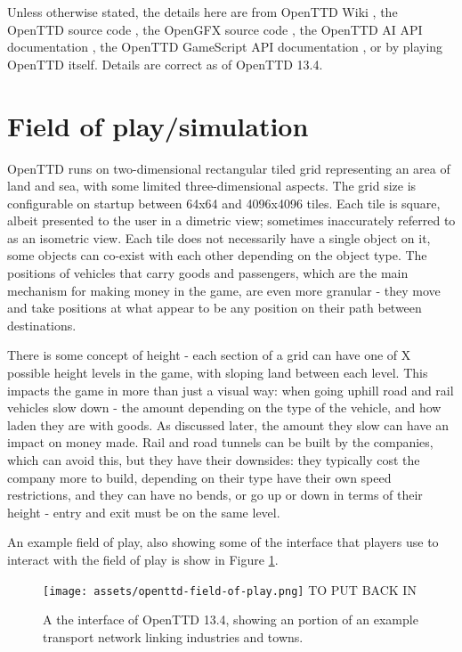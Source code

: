 \documentclass[logo,msc,dsti]{infthesis}    %
\begin{document}
Unless otherwise stated, the details here are from OpenTTD Wiki \cite{OpenTTDWiki}, the OpenTTD source code \cite{OpenTTDSource}, the OpenGFX source code \cite{OpenGFXSource}, the OpenTTD AI API documentation \cite{OpenTTDAIAPIDocs}, the OpenTTD GameScript API documentation \cite{OpenTTDGSAPIDocs}, or by playing OpenTTD itself. Details are correct as of OpenTTD 13.4.

\section{Field of play/simulation}

OpenTTD runs on two-dimensional rectangular tiled grid representing an area of land and sea, with some limited three-dimensional aspects. The grid size is configurable on startup between 64x64 and 4096x4096 tiles. Each tile is square, albeit presented to the user in a dimetric view; sometimes inaccurately referred to as an isometric view. Each tile does not necessarily have a single object on it, some objects can co-exist with each other depending on the object type. The positions of vehicles that carry goods and passengers, which are the main mechanism for making money in the game, are even more granular - they move and take positions at what appear to be any position on their path between destinations.

There is some concept of height - each section of a grid can have one of X possible height levels in the game, with sloping land between each level. This impacts the game in more than just a visual way: when going uphill road and rail vehicles slow down - the amount depending on the type of the vehicle, and how laden they are with goods. As discussed later, the amount they slow can have an impact on money made. Rail and road tunnels can be built by the companies, which can avoid this, but they have their downsides: they typically cost the company more to build, depending on their type have their own speed restrictions, and they can have no bends, or go up or down in terms of their height - entry and exit must be on the same level.

An example field of play, also showing some of the interface that players use to interact with the field of play is show in Figure \ref{figure:openttd-field-of-play}.

\begin{figure}[h]
\centering
\texttt{[image: assets/openttd-field-of-play.png]}
TO PUT BACK IN
\caption{A the interface of OpenTTD 13.4, showing an portion of an example transport network linking industries and towns.}
\label{figure:openttd-field-of-play}
\end{figure}
\end{document}
